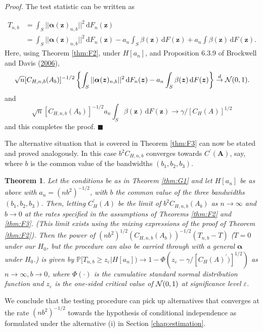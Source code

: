 \documentclass[
  12pt,
  letterpaper]{article}
\newtheorem{thm}{Theorem}[section]
\numberwithin{equation}{section}
\newcommand{\z}{\bm{z}}
\newcommand{\fA}{\bm{A}}
\newcommand{\falpha}{\bm{\alpha}}
\newcommand{\di}{\,\textrm{d}}
\begin{document}
\emph{Proof.} The test statistic can be written as

\begin{align*}
T_{n,b} & = \int_S ||{\falpha}(\z)_{n,b}||^2 \di F_n(\z) \\
&= \int _S ||{\falpha}(\z)_{n,b}||^2 \di F_n(\z) - a_n \int_S \beta(\z) \di F(\z) + a_n \int \beta(\z) \di F(\z).
\end{align*}
Here, using Theorem \ref{thm:F2}, under \(H[a_n]\), and Proposition 6.3.9 of Brockwell and Davis (\protect\hyperlink{ref-brockwell1991time}{2006}),
\[
\sqrt{n}[C_{H,n,b}(A_b)]^{-1/2}\left\{\int_S ||{\falpha}(\z)_{n,b}||^2 \di F_n(\z) - a_n \int_S \beta(\z) \di F(\z)\right\} \stackrel{d}{\to} {\cal N}(0,1).
\]
and
\[
\sqrt{n}[C_{H,n,b}(A_b)]^{-1/2} a_n \int_S \beta(\z) \di F(\z) \to \gamma/[C_H(A)]^{1/2}
\]
and this completes the proof. \(\blacksquare\)

The alternative situation that is covered in Theorem \ref{thm:F3} can now be stated and proved analogously. In this case \(b^2 C_{H,n,b}\) converges towards \(C^{\prime}(\fA)\), say, where \(b\) is the common value of the bandwidths \((b_1,b_2,b_3)\).

\begin{thm}
Let the conditions be as in Theorem \ref{thm:G1} and let $H[a_n]$ be as above with $a_n =(nb^2)^{-1/2}$, with $b$ the common value of the three bandwidths $(b_1,b_2,b_3)$. Then, letting $C_H^{\prime}(A)$ be the limit of $b^2C_{H,n,b}(A_b)$ as $n \to \infty$ and $b \to 0$ at the rates specified in the assumptions of Theorems \ref{thm:F2} and \ref{thm:F3}. (This limit exists using the mixing expressions of the proof of Theorem \ref{thm:F2}). Then the power of $(nb^2)^{1/2}(C_{H,n,b}(A_b))^{-1/2}(T_{n,b}-T)$ ($T = 0$ under our $H_0$, but the procedure can also be carried through with a general ${\falpha}$ under $H_0$.) is given by $\mathbb{P}[T_{n,b} \geq z_{\varepsilon}|H[a_n]) \to 1-\Phi(z_{\varepsilon}-\gamma/[C_{H}(A)^{\prime})]^{1/2})$ as $n \to \infty, b \to 0$, where $\Phi(\cdot)$ is the cumulative standard normal distribution function and $z_{\varepsilon}$ is the one-sided critical value of ${\cal N}(0,1)$ at significance level $\varepsilon$.
\label{thm:G2}
\end{thm}

We conclude that the testing procedure can pick up alternatives that converges at the rate \((nb^2)^{-1/2}\) towards the hypothesis of conditional independence as formulated under the alternative (i) in Section \ref{chap:estimation}.
\end{document}

